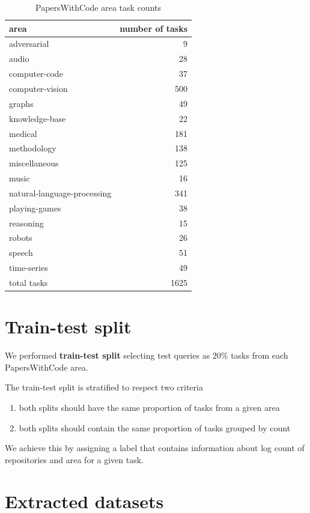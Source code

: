 \documentclass[longabstract,mgr,english]{iithesis}
\begin{document}
\begin{table}[htbp]
  \centering
  \caption{PapersWithCode area task counts}
  \begin{tabular}{|l|r|}
    \hline
    area & number of tasks\\
    \hline
    adversarial & 9\\
    audio & 28\\
    computer-code & 37\\
    computer-vision & 500\\
    graphs & 49\\
    knowledge-base & 22\\
    medical & 181\\
    methodology & 138\\
    miscellaneous & 125\\
    music & 16\\
    natural-language-processing & 341\\
    playing-games & 38\\
    reasoning & 15\\
    robots & 26\\
    speech & 51\\
    time-series & 49\\
    \hline
    total tasks & 1625\\
    \hline
  \end{tabular}
\end{table}

\section{Train-test split}

We performed \textbf{train-test split} selecting test queries as 20\% tasks from each PapersWithCode area. 

The train-test split is stratified to respect two criteria 
\begin{enumerate}
    \item both splits should have the same proportion of tasks from a given area
    \item both splits should contain the same proportion of tasks grouped by count
\end{enumerate}

We achieve this by assigning a label that contains information about log count of repositories and area for a given task.


\section{Extracted datasets}
\end{document}

